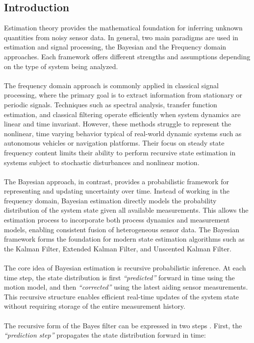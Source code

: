\subsection{Introduction}
Estimation theory provides the mathematical foundation for inferring unknown quantities from noisy sensor data. In general, two main paradigms are used in estimation and signal processing, the Bayesian and the Frequency domain approaches. Each framework offers different strengths and assumptions depending on the type of system being analyzed.  
\\ \\
The frequency domain approach is commonly applied in classical signal processing, where the primary goal is to extract information from stationary or periodic signals. Techniques such as spectral analysis, transfer function estimation, and classical filtering operate efficiently when system dynamics are linear and time invariant. However, these methods struggle to represent the nonlinear, time varying behavior typical of real-world dynamic systems such as autonomous vehicles or navigation platforms. Their focus on steady state frequency content limits their ability to perform recursive state estimation in systems subject to stochastic disturbances and nonlinear motion.  
\\ \\
The Bayesian approach, in contrast, provides a probabilistic framework for representing and updating uncertainty over time. Instead of working in the frequency domain, Bayesian estimation directly models the probability distribution of the system state given all available measurements. This allows the estimation process to incorporate both process dynamics and measurement models, enabling consistent fusion of heterogeneous sensor data. The Bayesian framework forms the foundation for modern state estimation algorithms such as the Kalman Filter, Extended Kalman Filter, and Unscented Kalman Filter.  
\\ \\
The core idea of Bayesian estimation is recursive probabilistic inference. At each time step, the state distribution is first \textit{``predicted''} forward in time using the motion model, and then \textit{``corrected''} using the latest aiding sensor measurements. This recursive structure enables efficient real-time updates of the system state without requiring storage of the entire measurement history. 
\\ \\
The recursive form of the Bayes filter can be expressed in two steps \cite{sensor_fusion_book}. First, the \textit{``prediction step''} propagates the state distribution forward in time:
